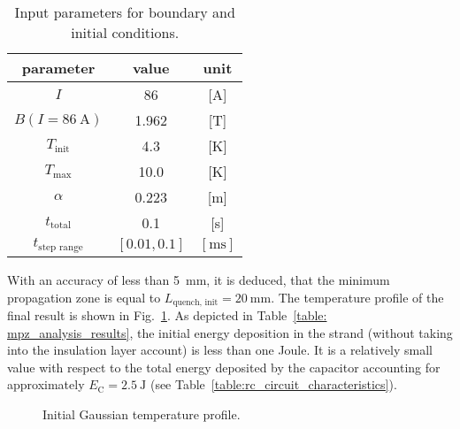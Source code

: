 \begin{table}[H]
    \caption{Input parameters for boundary and initial conditions.} 
    \vspace{-1.em} 
    \fontsize{10}{10}
    \selectfont 
    \renewcommand{\arraystretch}{1.5}
    \begin{center}
        \begin{tabular}{ ccc }  
        \hline
        parameter & value & unit \\
        \hline
        $I$ & 86 & [A] \\
        $B(I=86~\text{A})$ & 1.962 & [T] \\
        $T_\text{init}$ & 4.3 & [K] \\
        $T_\text{max}$ & 10.0 & [K] \\
        $\alpha$ & 0.223 & [m] \\   
        $t_\text{total}$ & 0.1 & [s] \\
        $t_\text{step range}$ & $[0.01, 0.1]$ & $[\text{ms}]$ \\
        \hline 
        \end{tabular}
    \end{center}  
     \label{table: mpz_analysis_input_parameters} 
 \end{table}
 
With an accuracy of less than 5~mm, it is deduced, that the minimum propagation zone is equal to $L_\text{quench, init}=20~\text{mm}$. The temperature profile of the final result is shown in Fig.~\ref{fig: init_gauss_temp_distr_mpz}. As depicted in Table~\ref{table: mpz_analysis_results}, the initial energy deposition in the strand (without taking into the insulation layer account) is less than one Joule. It is a relatively small value with respect to the total energy deposited by the capacitor accounting for approximately $E_\text{C}=2.5~\text{J}$ (see Table~\ref{table:rc_circuit_characteristics}).
 
\begin{figure}[H]
    \centering
    \caption{Initial Gaussian temperature profile.}
    \label{fig: init_gauss_temp_distr_mpz}
\end{figure}

